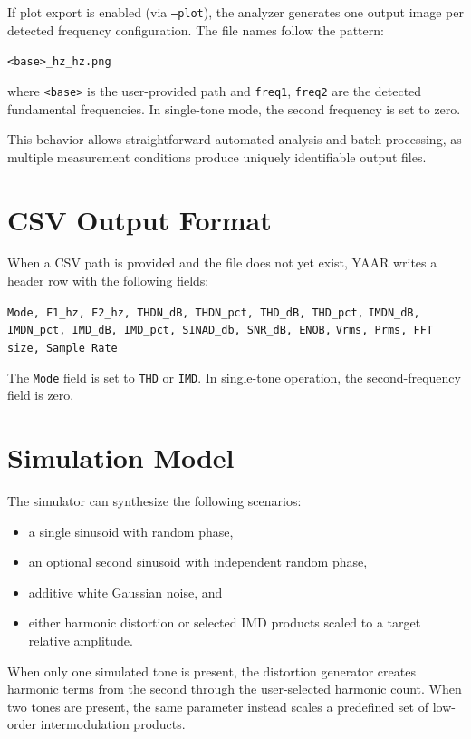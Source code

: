 \documentclass[conference]{IEEEtran}
\begin{document}
If plot export is enabled (via \texttt{--plot}), the analyzer generates one output image per detected frequency configuration. The file names follow the pattern:
\begin{center}
\texttt{<base>\_<freq1>hz\_<freq2>hz.png}
\end{center}
where \texttt{<base>} is the user-provided path and \texttt{freq1}, \texttt{freq2} are the detected fundamental frequencies. In single-tone mode, the second frequency is set to zero.

This behavior allows straightforward automated analysis and batch processing, as multiple measurement conditions produce uniquely identifiable output files.

\section{CSV Output Format}
When a CSV path is provided and the file does not yet exist, YAAR writes a header row with the following fields:
\begin{center}
\footnotesize
\texttt{Mode, F1\_hz, F2\_hz, THDN\_dB, THDN\_pct, THD\_dB, THD\_pct,}\newline
\texttt{IMDN\_dB, IMDN\_pct, IMD\_dB, IMD\_pct, SINAD\_db, SNR\_dB, ENOB,}\newline
\texttt{Vrms, Prms, FFT size, Sample Rate}
\end{center}

The \texttt{Mode} field is set to \texttt{THD} or \texttt{IMD}. In single-tone operation, the second-frequency field is zero.

\section{Simulation Model}
The simulator can synthesize the following scenarios:
\begin{itemize}[leftmargin=*,nosep]
    \item a single sinusoid with random phase,
    \item an optional second sinusoid with independent random phase,
    \item additive white Gaussian noise, and
    \item either harmonic distortion or selected IMD products scaled to a target relative amplitude.
\end{itemize}

When only one simulated tone is present, the distortion generator creates harmonic terms from the second through the user-selected harmonic count. When two tones are present, the same parameter instead scales a predefined set of low-order intermodulation products.
\end{document}
